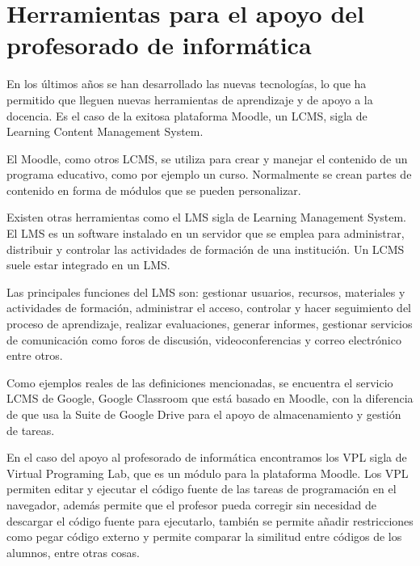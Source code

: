
\section{Herramientas para el apoyo del profesorado de informática}
\label{1:sec:1}

En los últimos años se han desarrollado las nuevas tecnologías, lo que ha permitido que lleguen nuevas herramientas de aprendizaje y de apoyo a la docencia. Es el caso de la exitosa plataforma Moodle, un LCMS, sigla de Learning Content Management System. 

El Moodle, como otros LCMS, se utiliza para crear y manejar el contenido de un programa educativo, como por ejemplo un curso. Normalmente se crean partes de contenido en forma de módulos que se pueden personalizar.

Existen otras herramientas como el LMS sigla de Learning Management System. El LMS es un software instalado en un servidor que se emplea para administrar, distribuir y controlar las actividades de formación de una institución. Un LCMS suele estar integrado en un LMS.

Las principales funciones del LMS son: gestionar usuarios, recursos, materiales y actividades de formación, administrar el acceso, controlar y hacer seguimiento del proceso de aprendizaje, realizar evaluaciones, generar informes, gestionar servicios de comunicación como foros de discusión, videoconferencias y correo electrónico entre otros.

Como ejemplos reales de las definiciones mencionadas, se encuentra el servicio LCMS de Google, Google Classroom que está basado en Moodle, con la diferencia de que usa la Suite de Google Drive para el apoyo de almacenamiento y gestión de tareas.

En el caso del apoyo al profesorado de informática encontramos los VPL sigla de Virtual Programing Lab, que es un módulo para la plataforma Moodle. Los VPL permiten editar y ejecutar el código fuente de las tareas de programación en el navegador, además permite que el profesor pueda corregir sin necesidad de descargar el código fuente para ejecutarlo, también se permite añadir restricciones como pegar código externo y permite comparar la similitud entre códigos de los alumnos, entre otras cosas.

